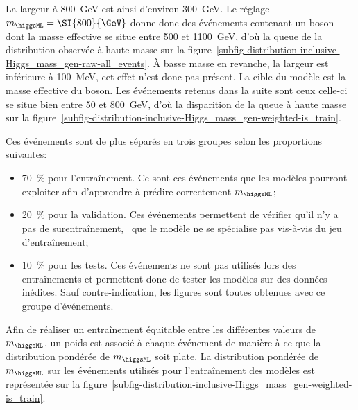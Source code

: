 La largeur à \SI{800}{\GeV} est ainsi d'environ \SI{300}{\GeV}.
Le réglage $m_{\higgsML} = \SI{800}{\GeV}$ donne donc des événements contenant un boson dont la masse effective se situe entre \num{500} et \SI{1100}{\GeV}, d'où la queue de la distribution observée à haute masse sur la figure~\ref{subfig-distribution-inclusive-Higgs_mass_gen-raw-all_events}.
À basse masse en revanche, la largeur est inférieure à \SI{100}{\MeV}, cet effet n'est donc pas présent.
La cible du modèle est la masse effective du boson.
Les événements retenus dans la suite sont ceux celle-ci se situe bien entre \num{50} et \SI{800}{\GeV},
d'où la disparition de la queue à haute masse sur la figure~\ref{subfig-distribution-inclusive-Higgs_mass_gen-weighted-is_train}.
\par
Ces événements sont de plus séparés en trois groupes selon les proportions suivantes:
\begin{itemize}
\item \SI{70}{\%} pour l'entraînement. Ce sont ces événements que les modèles pourront exploiter afin d'apprendre à prédire correctement $m_{\higgsML}$;
\item \SI{20}{\%} pour la validation. Ces événements permettent de vérifier qu'il n'y a pas de surentraînement, \ie\ que le modèle ne se spécialise pas vis-à-vis du jeu d'entraînement;
\item \SI{10}{\%} pour les tests. Ces événements ne sont pas utilisés lors des entraînements et permettent donc de tester les modèles sur des données inédites. Sauf contre-indication, les figures sont toutes obtenues avec ce groupe d'événements.
\end{itemize}
\par
Afin de réaliser un entraînement équitable entre les différentes valeurs de $m_{\higgsML}$, un poids est associé à chaque événement de manière à ce que la distribution pondérée de $m_{\higgsML}$ soit plate.
La distribution pondérée de $m_{\higgsML}$ sur les événements utilisés pour l'entraînement des modèles est représentée sur la figure~\ref{subfig-distribution-inclusive-Higgs_mass_gen-weighted-is_train}.
